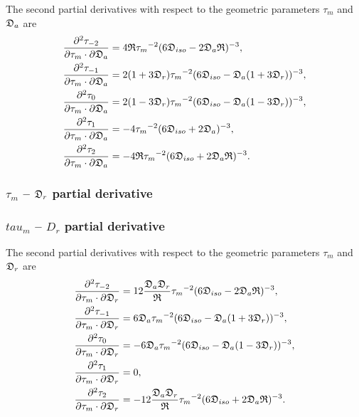 The second partial derivatives with respect to the geometric parameters $\tau_m$ and $\mathfrak{D}_a$ are
\begin{subequations}
\begin{align}
    \frac{\partial^2 \tau_{-2}}{\partial \tau_m \cdot \partial \mathfrak{D}_a} &= 4\mathfrak{R} {\tau_m}^{-2} (6\mathfrak{D}_{iso} - 2\mathfrak{D}_a\mathfrak{R})^{-3}, \\
    \frac{\partial^2 \tau_{-1}}{\partial \tau_m \cdot \partial \mathfrak{D}_a} &= 2(1 + 3\mathfrak{D}_r){\tau_m}^{-2} (6\mathfrak{D}_{iso} - \mathfrak{D}_a (1 + 3\mathfrak{D}_r))^{-3}, \\
    \frac{\partial^2 \tau_{0}}{\partial \tau_m \cdot \partial \mathfrak{D}_a}  &= 2(1 - 3\mathfrak{D}_r){\tau_m}^{-2} (6\mathfrak{D}_{iso} - \mathfrak{D}_a (1 - 3\mathfrak{D}_r))^{-3}, \\
    \frac{\partial^2 \tau_{1}}{\partial \tau_m \cdot \partial \mathfrak{D}_a}  &= -4{\tau_m}^{-2} (6\mathfrak{D}_{iso} + 2\mathfrak{D}_a)^{-3}, \\
    \frac{\partial^2 \tau_{2}}{\partial \tau_m \cdot \partial \mathfrak{D}_a}  &= -4\mathfrak{R} {\tau_m}^{-2} (6\mathfrak{D}_{iso} + 2\mathfrak{D}_a\mathfrak{R})^{-3}.
\end{align}
\end{subequations}



\begin{latexonly}
    \subsubsection{$\tau_m$ -- $\mathfrak{D}_r$ partial derivative}
\end{latexonly}
\begin{htmlonly}
    \subsubsection{$tau_m$ -- $D_r$ partial derivative}
\end{htmlonly}

The second partial derivatives with respect to the geometric parameters $\tau_m$ and $\mathfrak{D}_r$ are
\begin{subequations}
\begin{align}
    \frac{\partial^2 \tau_{-2}}{\partial \tau_m \cdot \partial \mathfrak{D}_r} &= 12 \frac{\mathfrak{D}_a \mathfrak{D}_r}{\mathfrak{R}} {\tau_m}^{-2} (6\mathfrak{D}_{iso} - 2\mathfrak{D}_a\mathfrak{R})^{-3}, \\
    \frac{\partial^2 \tau_{-1}}{\partial \tau_m \cdot \partial \mathfrak{D}_r} &= 6 \mathfrak{D}_a {\tau_m}^{-2} (6\mathfrak{D}_{iso} - \mathfrak{D}_a (1 + 3\mathfrak{D}_r))^{-3}, \\
    \frac{\partial^2 \tau_{0}}{\partial \tau_m \cdot \partial \mathfrak{D}_r}  &= -6 \mathfrak{D}_a {\tau_m}^{-2} (6\mathfrak{D}_{iso} - \mathfrak{D}_a (1 - 3\mathfrak{D}_r))^{-3}, \\
    \frac{\partial^2 \tau_{1}}{\partial \tau_m \cdot \partial \mathfrak{D}_r}  &= 0, \\
    \frac{\partial^2 \tau_{2}}{\partial \tau_m \cdot \partial \mathfrak{D}_r}  &= -12 \frac{\mathfrak{D}_a \mathfrak{D}_r}{\mathfrak{R}} {\tau_m}^{-2} (6\mathfrak{D}_{iso} + 2\mathfrak{D}_a\mathfrak{R})^{-3}.
\end{align}
\end{subequations}



